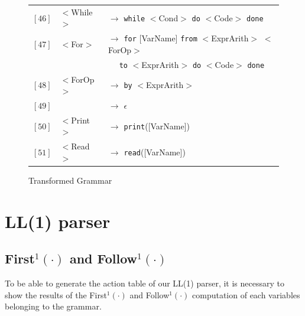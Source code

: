 \documentclass[letterpaper]{article}
\begin{document}
\begin{figure}[H]
\begin{tabular}{r l l}
        $[46]$ & $<$While$>$ & $\rightarrow$
        \texttt{while} $<$Cond$>$ \texttt{do}
        $<$Code$>$ \texttt{done} \\
        $[47]$ & $<$For$>$ & $\rightarrow$
        \texttt{for} [VarName] \texttt{from}
        $<$ExprArith$>$ $<$ForOp$>$ \\
        & &
        $\quad$ \texttt{to} $<$ExprArith$>$
        \texttt{do} $<$Code$>$ \texttt{done} \\
        $[48]$ & $<$ForOp$>$ & $\rightarrow$
        \texttt{by} $<$ExprArith$>$ \\
        $[49]$ & & $\rightarrow$ $\epsilon$ \\
        $[50]$ & $<$Print$>$ & $\rightarrow$
        \texttt{print}([VarName]) \\
        $[51]$ & $<$Read$>$ & $\rightarrow$ \texttt{read}([VarName]) \\
    \end{tabular}
    \caption{Transformed Grammar}
    \label{fig:fullcfg}
\end{figure}

\section{LL(1) parser}

\subsection{First$^1(\cdot)$ and Follow$^1(\cdot)$}
To be able to generate the action table of our LL(1) parser, it is necessary
to show the results of the First$^1(\cdot)$ and Follow$^1(\cdot)$
computation of each variables
belonging to the grammar.
\end{document}
